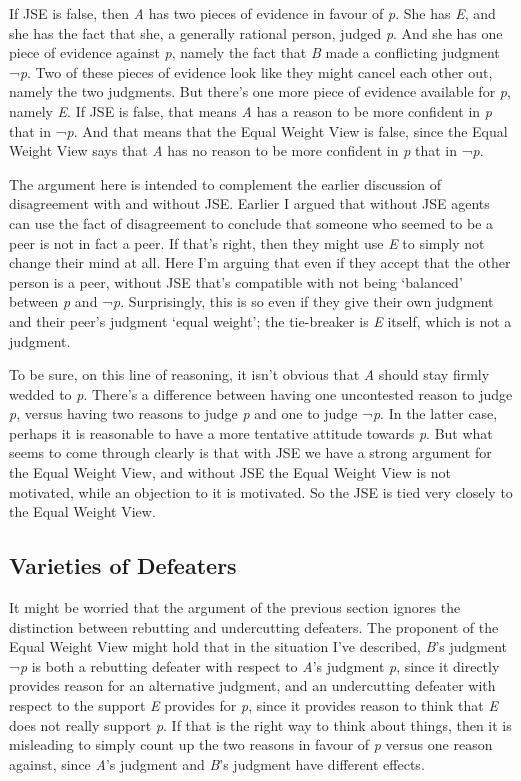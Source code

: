 \documentclass[
  11pt,
  letterpaper,
  DIV=11,
  numbers=noendperiod,
  twoside]{scrartcl}
\begin{document}
If JSE is false, then \emph{A} has two pieces of evidence in favour of
\emph{p}. She has \emph{E}, and she has the fact that she, a generally
rational person, judged \emph{p}. And she has one piece of evidence
against \emph{p}, namely the fact that \emph{B} made a conflicting
judgment ¬\emph{p}. Two of these pieces of evidence look like they might
cancel each other out, namely the two judgments. But there's one more
piece of evidence available for \emph{p}, namely \emph{E}. If JSE is
false, that means \emph{A} has a reason to be more confident in \emph{p}
that in ¬\emph{p}. And that means that the Equal Weight View is false,
since the Equal Weight View says that \emph{A} has no reason to be more
confident in \emph{p} that in ¬\emph{p}.

The argument here is intended to complement the earlier discussion of
disagreement with and without JSE. Earlier I argued that without JSE
agents can use the fact of disagreement to conclude that someone who
seemed to be a peer is not in fact a peer. If that's right, then they
might use \emph{E} to simply not change their mind at all. Here I'm
arguing that even if they accept that the other person is a peer,
without JSE that's compatible with not being `balanced' between \emph{p}
and ¬\emph{p}. Surprisingly, this is so even if they give their own
judgment and their peer's judgment `equal weight'; the tie-breaker is
\emph{E} itself, which is not a judgment.

To be sure, on this line of reasoning, it isn't obvious that \emph{A}
should stay firmly wedded to \emph{p}. There's a difference between
having one uncontested reason to judge \emph{p}, versus having two
reasons to judge \emph{p} and one to judge ¬\emph{p}. In the latter
case, perhaps it is reasonable to have a more tentative attitude towards
\emph{p}. But what seems to come through clearly is that with JSE we
have a strong argument for the Equal Weight View, and without JSE the
Equal Weight View is not motivated, while an objection to it is
motivated. So the JSE is tied very closely to the Equal Weight View.

\subsection{Varieties of Defeaters}\label{varieties-of-defeaters}

It might be worried that the argument of the previous section ignores
the distinction between rebutting and undercutting defeaters. The
proponent of the Equal Weight View might hold that in the situation I've
described, \emph{B}'s judgment ¬\emph{p} is both a rebutting defeater
with respect to \emph{A}'s judgment \emph{p}, since it directly provides
reason for an alternative judgment, and an undercutting defeater with
respect to the support \emph{E} provides for \emph{p}, since it provides
reason to think that \emph{E} does not really support \emph{p}. If that
is the right way to think about things, then it is misleading to simply
count up the two reasons in favour of \emph{p} versus one reason
against, since \emph{A}'s judgment and \emph{B}'s judgment have
different effects.
\end{document}
